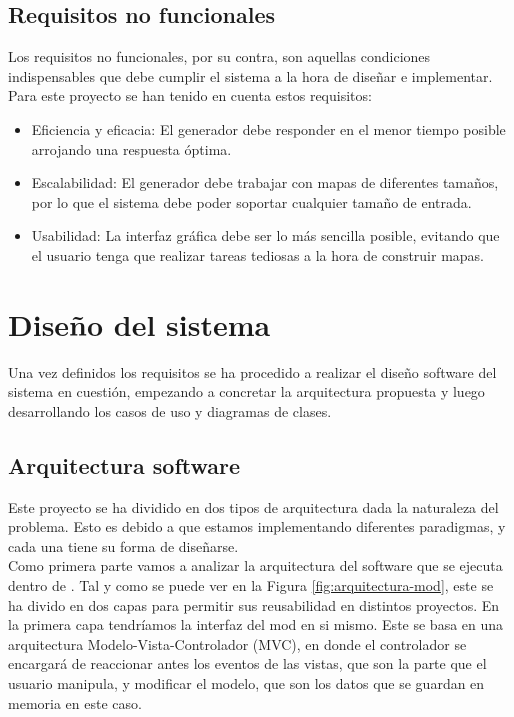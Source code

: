 \subsection{Requisitos no funcionales}

Los requisitos no funcionales, por su contra, son aquellas condiciones indispensables que debe cumplir el sistema a la hora de diseñar e implementar. Para este proyecto se han tenido en cuenta estos requisitos:

\begin{itemize}
	\item Eficiencia y eficacia: El generador debe responder en el menor tiempo posible arrojando una respuesta óptima.
	\item Escalabilidad: El generador debe trabajar con mapas de diferentes tamaños, por lo que el sistema debe poder soportar cualquier tamaño de entrada.
	\item Usabilidad: La interfaz gráfica debe ser lo más sencilla posible, evitando que el usuario tenga que realizar tareas tediosas a la hora de construir mapas.
\end{itemize}

\section{Diseño del sistema}

Una vez definidos los requisitos se ha procedido a realizar el diseño software del sistema en cuestión, empezando a concretar la arquitectura propuesta y luego desarrollando los casos de uso y diagramas de clases.

\subsection{Arquitectura software}
\label{subsec:arquitectura}

Este proyecto se ha dividido en dos tipos de arquitectura dada la naturaleza del problema. Esto es debido a que estamos implementando diferentes paradigmas, y cada una tiene su forma de diseñarse. \\

Como primera parte vamos a analizar la arquitectura del software que se ejecuta dentro de \cities. Tal y como se puede ver en la Figura \ref{fig:arquitectura-mod}, este se ha divido en dos capas para permitir sus reusabilidad en distintos proyectos. En la primera capa tendríamos la interfaz del mod en si mismo. Este se basa en una arquitectura Modelo-Vista-Controlador (MVC), en donde el controlador se encargará de reaccionar antes los eventos de las vistas, que son la parte que el usuario manipula, y modificar el modelo, que son los datos que se guardan en memoria en este caso. \\

